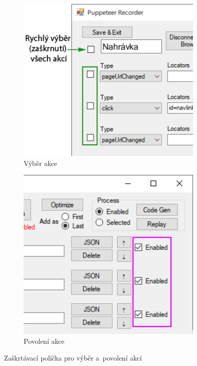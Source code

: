 \documentclass[12pt, a4paper, twoside]{article}
\begin{document}
	\begin{figure}[H]
		\centering
		\begin{subfigure}[t]{0.48\textwidth}
			\includegraphics[width=1.0\textwidth, left]{selectActions.png}
			\caption{Výběr akce}
		\end{subfigure}	
		\hfill
		\begin{subfigure}[t]{0.46\textwidth}
			\includegraphics[width=1.0\textwidth, right]{enableActions.png}
			\caption{Povolení akce}
		\end{subfigure}	
		\caption{Zaškrtávací políčka pro výběr a~povolení akcí}
	\end{figure}
\end{document}

